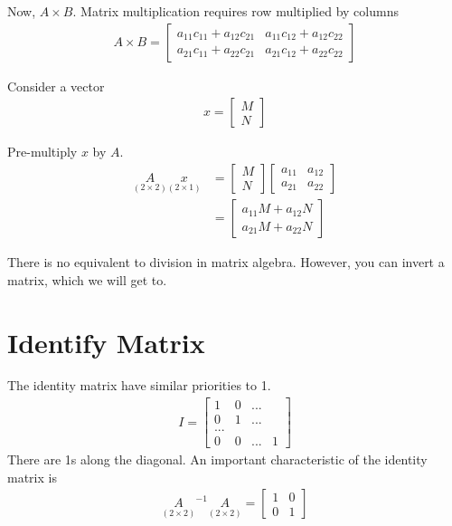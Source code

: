\documentclass{article}
\begin{document}
Now,  $A \times B$. Matrix multiplication requires row multiplied by columns 
\begin{align}
    A \times B = \begin{bmatrix}
        a_{11} c_{11} + a_{12} c_{21}  & a_{11} c_{12} + a_{12} c_{22} \\
        a_{21} c_{11} + a_{22} c_{21}  & a_{21} c_{12} + a_{22} c_{22} 
    \end{bmatrix}
\end{align}

Consider a vector 
\begin{align}
    x = \begin{bmatrix}
            M \\
            N
        \end{bmatrix}
\end{align}

Pre-multiply $x$ by $A$. 
\begin{align}
    \underset{(2 \times 2)}{A} \underset{(2 \times 1)}{x} &= \begin{bmatrix}
            M \\
            N
        \end{bmatrix} 
        \begin{bmatrix}
            a_{11} & a_{12} \\
            a_{21} & a_{22}
        \end{bmatrix} \\
       &= \begin{bmatrix}
           a_{11} M + a_{12}N \\
           a_{21}M + a_{22}N
       \end{bmatrix} 
\end{align}

There is no equivalent to division in matrix algebra. However, you can invert a matrix, which we will get to. 

\section{Identify Matrix}

The identity matrix have similar priorities to 1. 
\begin{align}
    I = \begin{bmatrix}
        1 & 0 &  ... \\
        0 & 1 & ... \\
        ... & \\
        0 & 0 & ... & 1
    \end{bmatrix}
\end{align}
There are 1s along the diagonal. An important characteristic of the identity matrix is 
\begin{align}
    \underset{(2 \times 2)} A^{-1}  \underset{(2 \times 2)} A = \begin{bmatrix}
                    1 & 0 \\
                    0 & 1
                \end{bmatrix}
\end{align}
\end{document}
